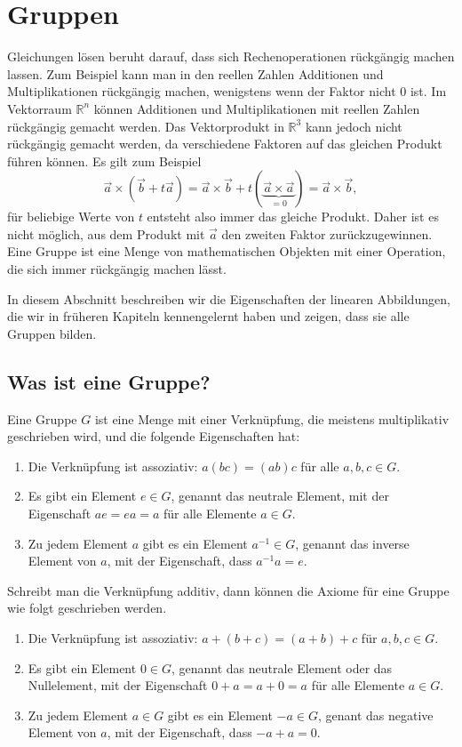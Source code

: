 %
%
%
\section{Gruppen\label{section:gruppen}}
Gleichungen lösen beruht darauf, dass sich Rechenoperationen rückgängig
machen lassen.
Zum Beispiel kann man in den reellen Zahlen Additionen und Multiplikationen
rückgängig machen, wenigstens wenn der Faktor nicht $0$ ist.
Im Vektorraum $\mathbb R^n$ können Additionen und
Multiplikationen mit reellen Zahlen rückgängig gemacht werden.
Das Vektorprodukt in $\mathbb R^3$ kann jedoch nicht rückgängig gemacht
werden, da verschiedene Faktoren auf das gleichen Produkt führen können.
Es gilt zum Beispiel
\[
\vec{a} \times (\vec{b} + t\vec{a})
=
\vec{a} \times \vec{b} + t(\underbrace{\vec{a}\times\vec{a}}_{\displaystyle=0})
=
\vec{a} \times \vec{b},
\]
für beliebige Werte von $t$ entsteht also immer das gleiche Produkt.
Daher ist es nicht möglich, aus dem Produkt mit $\vec{a}$ den
zweiten Faktor zurückzugewinnen.
Eine Gruppe ist eine Menge von mathematischen Objekten mit einer
Operation, die sich immer rückgängig machen lässt.

In diesem Abschnitt beschreiben wir die Eigenschaften der linearen
Abbildungen, die wir in früheren Kapiteln kennengelernt haben und
zeigen, dass sie alle Gruppen bilden.

%
%
\subsection{Was ist eine Gruppe?}
\begin{definition}
Eine Gruppe $G$ ist eine Menge mit einer Verknüpfung, die meistens
multiplikativ geschrieben wird, und die folgende Eigenschaften hat:
\begin{enumerate}
\item Die Verknüpfung ist assoziativ: $a(bc)=(ab)c$ für alle $a,b,c\in G$.
\item Es gibt ein Element $e\in G$, genannt das neutrale Element,
mit der Eigenschaft $ae=ea=a$ für alle
Elemente $a\in G$.
\item Zu jedem Element $a$ gibt es ein Element $a^{-1}\in G$, genannt
das inverse Element von $a$, mit der
Eigenschaft, dass $a^{-1}a=e$.
\end{enumerate}
\end{definition}

Schreibt man die Verknüpfung additiv, dann können die Axiome für
eine Gruppe wie folgt geschrieben werden.
\begin{enumerate}
\item Die Verknüpfung ist assoziativ:
$a+(b+c)=(a+b)+c$ für $a,b,c\in G$.
\item Es gibt ein Element $0\in G$, genannt das neutrale Element oder
das Nullelement, mit der Eigenschaft $0+a=a+0=a$ für alle Elemente $a\in G$.
\item Zu jedem Element $a\in G$ gibt es ein Element $-a\in G$, genant
das negative Element von $a$, mit der Eigenschaft, dass $-a + a=0$.
\end{enumerate}

